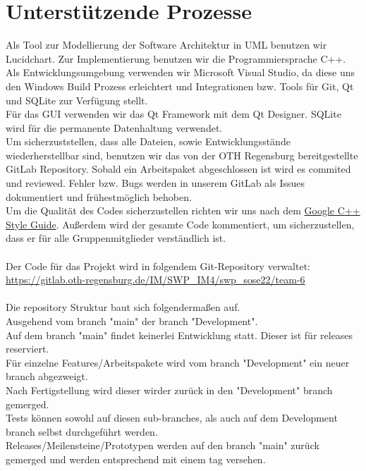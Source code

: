 \documentclass[12pt,a4paper,onecolumn]{article}
\begin{document}
\section{Unterstützende Prozesse}
Als Tool zur Modellierung der Software Architektur in UML benutzen wir Lucidchart.
Zur Implementierung benutzen wir die Programmiersprache C++. Als Entwicklungsumgebung verwenden wir Microsoft Visual Studio, da diese uns den Windows Build Prozess erleichtert und Integrationen bzw. Tools für Git, Qt und SQLite zur Verfügung stellt.\\
Für das GUI verwenden wir das Qt Framework mit dem Qt Designer. SQLite wird für die permanente Datenhaltung verwendet.\\
Um sicherzuststellen, dass alle Dateien, sowie Entwicklungsstände wiederherstellbar sind, benutzen wir das von der OTH Regensburg bereitgestellte GitLab Repository. Sobald ein Arbeitspaket abgeschlossen ist wird es commited und reviewed. Fehler bzw. Bugs werden in unserem GitLab als Issues dokumentiert und frühestmöglich behoben.\\
Um die Qualität des Codes sicherzustellen richten wir uns nach dem \href{https://google.github.io/styleguide/cppguide.html}{Google C++ Style Guide}. Außerdem wird der gesamte Code kommentiert, um sicherzustellen, dass er für alle Gruppenmitglieder verständlich ist.\\
\\
Der Code für das Projekt wird in folgendem Git-Repository verwaltet:\\
\url{https://gitlab.oth-regensburg.de/IM/SWP_IM4/swp_sose22/team-6}\\\\
Die repository Struktur baut sich folgendermaßen auf.\\
Ausgehend vom branch "main" der branch "Development".\\
Auf dem branch "main" findet keinerlei Entwicklung statt. Dieser ist für releases reserviert.\\
Für einzelne Features/Arbeitspakete wird vom branch "Development" ein neuer branch abgezweigt.\\
Nach Fertigstellung wird dieser wirder zurück in den "Development" branch gemerged.\\
Tests können sowohl auf diesen sub-branches, als auch auf dem Development branch selbst durchgeführt werden.\\
Releases/Meilensteine/Prototypen werden auf den branch "main" zurück gemerged und werden entsprechend mit einem tag versehen.


\end{document}
